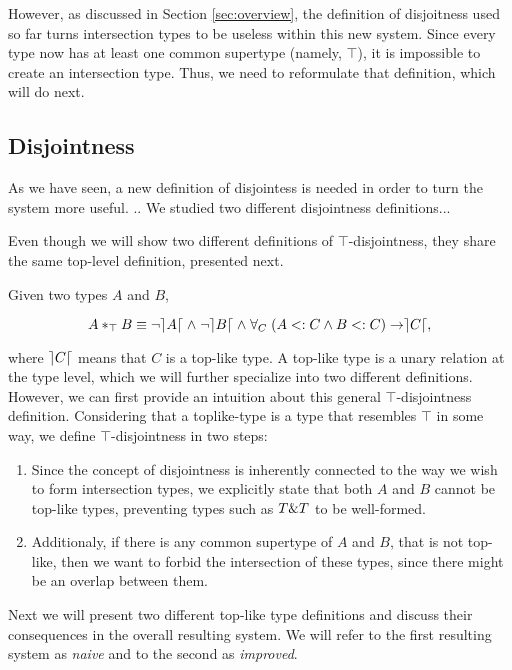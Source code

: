 However, as discussed in Section \ref{sec:overview}, the definition of disjoitness used so far turns intersection types to
be useless within this new system.
Since every type now has at least one common supertype (namely, $\top$), it is impossible to create an intersection type.
Thus, we need to reformulate that definition, which will do next.

\subsection{Disjointness} 

As we have seen, a new definition of disjointess is needed in order to turn the system more useful.
..
We studied two different disjointness definitions...


Even though we will show two different definitions of $\top$-disjointness, they share the same top-level definition, 
presented next.
\begin{definition}
Given two types $A$ and $B$, 

\[A *_{\top} B \equiv \neg \rceil A \lceil \; \wedge \; \neg \rceil B \lceil \; \wedge \; 
\forall_C \; ( A <: C \wedge B <: C ) \rightarrow \rceil C \lceil, \]

\end{definition}
where $\rceil C \lceil$ means that $C$ is a top-like type.
A top-like type is a unary relation at the type level, which we will further specialize into two different definitions. 
However, we can first provide an intuition about this general $\top$-disjointness definition.
Considering that a toplike-type is a type that resembles $\top$ in some way, we define $\top$-disjointness in two steps:
\begin{enumerate}
\item Since the concept of disjointness is inherently connected to the way we wish to form intersection types,
we explicitly state that both $A$ and $B$ cannot be top-like types, preventing types such as $T \& T$ to be well-formed.
\item Additionaly, if there is any common supertype of $A$ and $B$, that is not top-like, then we want to forbid the 
intersection of these types, since there might be an overlap between them. 
\end{enumerate}

Next we will present two different top-like type definitions and discuss their consequences in the overall resulting system.
We will refer to the first resulting system as \emph{naive} and to the second as \emph{improved}. 

